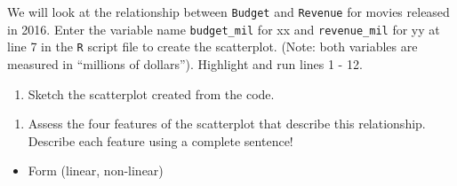 \documentclass[
]{report}
\newenvironment{Shaded}{\begin{snugshade}}{\end{snugshade}}
\newcommand{\CommentTok}[1]{\textcolor[rgb]{0.56,0.35,0.01}{\textit{#1}}}
\newcommand{\DataTypeTok}[1]{\textcolor[rgb]{0.13,0.29,0.53}{#1}}
\newcommand{\KeywordTok}[1]{\textcolor[rgb]{0.13,0.29,0.53}{\textbf{#1}}}
\newcommand{\NormalTok}[1]{#1}
\newcommand{\OperatorTok}[1]{\textcolor[rgb]{0.81,0.36,0.00}{\textbf{#1}}}
\newcommand{\OtherTok}[1]{\textcolor[rgb]{0.56,0.35,0.01}{#1}}
\newcommand{\StringTok}[1]{\textcolor[rgb]{0.31,0.60,0.02}{#1}}
\providecommand{\tightlist}{%
  \setlength{\itemsep}{0pt}\setlength{\parskip}{0pt}}
\begin{document}
\vspace{0.4in}

We will look at the relationship between \texttt{Budget} and \texttt{Revenue} for movies released in 2016. Enter the variable name \texttt{budget\_mil} for xx and \texttt{revenue\_mil} for yy at line 7 in the \texttt{R} script file to create the scatterplot. (Note: both variables are measured in ``millions of dollars''). Highlight and run lines 1 - 12.

\begin{Shaded}
\end{Shaded}

\begin{enumerate}
\def\labelenumi{\arabic{enumi}.}
\setcounter{enumi}{2}
\tightlist
\item
  Sketch the scatterplot created from the code.
\end{enumerate}

\vspace{1.5in}
\newpage

\begin{enumerate}
\def\labelenumi{\arabic{enumi}.}
\setcounter{enumi}{3}
\tightlist
\item
  Assess the four features of the scatterplot that describe this relationship. Describe each feature using a complete sentence!
\end{enumerate}

\begin{itemize}
\tightlist
\item
  Form (linear, non-linear)
\end{itemize}
\end{document}
